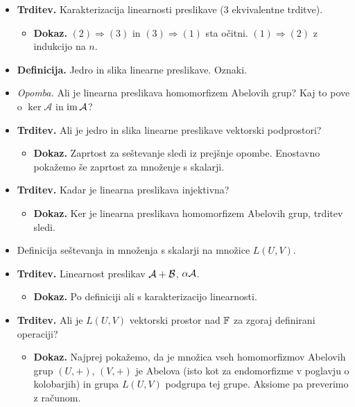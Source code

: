 \begin{enumerate}
\begin{itemize}
        \item \colorbox{blue!30}{\textbf{Trditev.}} Karakterizacija linearnosti preslikave (3 ekvivalentne trditve).
        \begin{itemize}
            \item \colorbox{green!30}{\textbf{Dokaz.}} $(2) \Rightarrow (3)$ in $(3) \Rightarrow (1)$ sta očitni. $(1) \Rightarrow (2)$ z indukcijo na $n$.
        \end{itemize}
        \item \colorbox{purple!30}{\textbf{Definicija.}} Jedro in slika linearne preslikave. Oznaki.
        \item \colorbox{yellow!30}{\emph{Opomba.}} Ali je linearna preslikava homomorfizem Abelovih grup? Kaj to pove o $\ker \mathcal{A}$ in $\operatorname{im} \mathcal{A}$?
        \item \colorbox{blue!30}{\textbf{Trditev.}} Ali je jedro in slika linearne preslikave vektorski podprostori?
        \begin{itemize}
            \item \colorbox{green!30}{\textbf{Dokaz.}} Zaprtost za seštevanje sledi iz prejšnje opombe. Enostavno pokažemo še zaprtost za množenje s skalarji.
        \end{itemize}
        \item \colorbox{blue!30}{\textbf{Trditev.}} Kadar je linearna preslikava injektivna?
        \begin{itemize}
            \item \colorbox{green!30}{\textbf{Dokaz.}} Ker je linearna preslikava homomorfizem Abelovih grup, trditev sledi.
        \end{itemize}
        \item Definicija seštevanja in množenja s skalarji na množice $L(U, V)$.
        \item \colorbox{blue!30}{\textbf{Trditev.}} Linearnost preslikav $\mathcal{A} + \mathcal{B}$, $\alpha \mathcal{A}$.
        \begin{itemize}
            \item \colorbox{green!30}{\textbf{Dokaz.}} Po definiciji ali s karakterizacijo linearnosti.
        \end{itemize}
        \item \colorbox{blue!30}{\textbf{Trditev.}} Ali je $L(U, V)$ vektorski prostor nad $\mathbb{F}$ za zgoraj definirani operaciji?
        \begin{itemize}
            \item \colorbox{green!30}{\textbf{Dokaz.}} Najprej pokažemo, da je množica vseh homomorfizmov Abelovih grup $(U, +)$, $(V,+)$ je Abelova (isto kot za endomorfizme v poglavju o kolobarjih) in grupa $L(U, V)$ podgrupa tej grupe. Aksiome pa preverimo z računom.

\end{itemize}
\end{itemize}
\end{enumerate}
